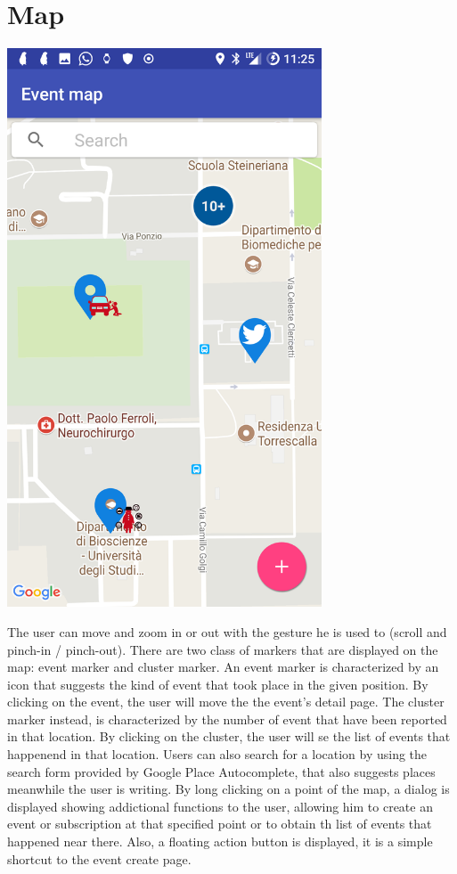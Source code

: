 \documentclass[a4paper]{scrreprt}
\begin{document}
\section{Map}
\begin{minipage}{0.5\textwidth}
	\centering
	\includegraphics[width=0.7\textwidth]{imgs/event_map}
\end{minipage}
\begin{minipage}{0.5\textwidth}
	 The user can move and zoom in or out with the gesture he is used to (scroll and pinch-in / pinch-out). There are two class of markers that are displayed on the map: event marker and cluster marker. An event marker is characterized by an icon that suggests the kind of event that took place in the given position. By clicking on the event, the user will move the the event's detail page. The cluster marker instead, is characterized by the number of event that have been reported in that location. By clicking on the cluster, the user will se the list of events that happenend in that location. Users can also search for a  location by using the search form provided by Google Place Autocomplete, that also suggests places meanwhile the user is writing. By long clicking on a point of the map, a dialog is displayed showing addictional functions to the user, allowing him to create an event or subscription at that specified point or to obtain th list of events that happened near there. Also, a floating action button is displayed, it is a simple shortcut to the event create page.
\end{minipage}
\end{document}
